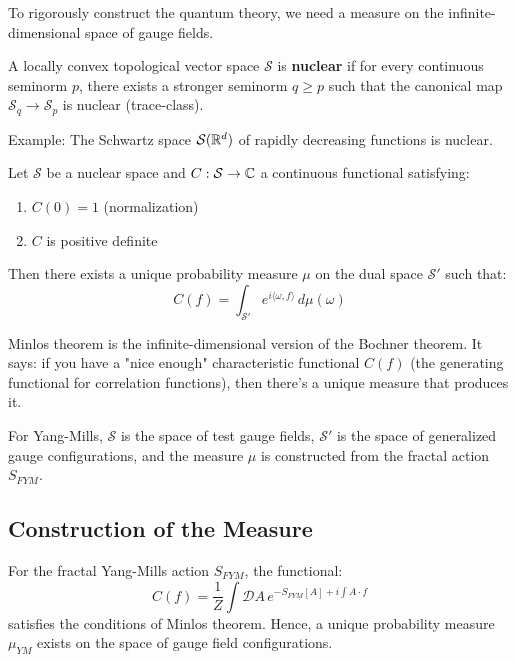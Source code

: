 To rigorously construct the quantum theory, we need a measure on the infinite-dimensional space of gauge fields.

\begin{defn}\label{def:nuclear-space}
A locally convex topological vector space $\mathcal{S}$ is \textbf{nuclear} if for every continuous seminorm $p$, there exists a stronger seminorm $q \geq p$ such that the canonical map $\mathcal{S}_q \to \mathcal{S}_p$ is nuclear (trace-class).

Example: The Schwartz space $\mathcal{S}(\mathbb{R}^d)$ of rapidly decreasing functions is nuclear.
\end{defn}

\begin{theorem}[Minlos]\label{thm:minlos}
Let $\mathcal{S}$ be a nuclear space and $C: \mathcal{S} \to \mathbb{C}$ a continuous functional satisfying:
\begin{enumerate}
\item $C(0) = 1$ (normalization)
\item $C$ is positive definite
\end{enumerate}
Then there exists a unique probability measure $\mu$ on the dual space $\mathcal{S}'$ such that:
\begin{equation}
C(f) = \int_{\mathcal{S}'} e^{i\langle\omega, f\rangle} \, d\mu(\omega)
\end{equation}
\end{theorem}

\begin{intuitive}
Minlos theorem is the infinite-dimensional version of the Bochner theorem. It says: if you have a "nice enough" characteristic functional $C(f)$ (the generating functional for correlation functions), then there's a unique measure that produces it.

For Yang-Mills, $\mathcal{S}$ is the space of test gauge fields, $\mathcal{S}'$ is the space of generalized gauge configurations, and the measure $\mu$ is constructed from the fractal action $S_{FYM}$.
\end{intuitive}

\subsection{Construction of the Measure}

\begin{theorem}\label{thm:ym-measure-exists}
For the fractal Yang-Mills action $S_{FYM}$, the functional:
\begin{equation}
C(f) = \frac{1}{Z} \int \mathcal{D}A \, e^{-S_{FYM}[A] + i\int A \cdot f}
\end{equation}
satisfies the conditions of Minlos theorem. Hence, a unique probability measure $\mu_{YM}$ exists on the space of gauge field configurations.
\end{theorem}

